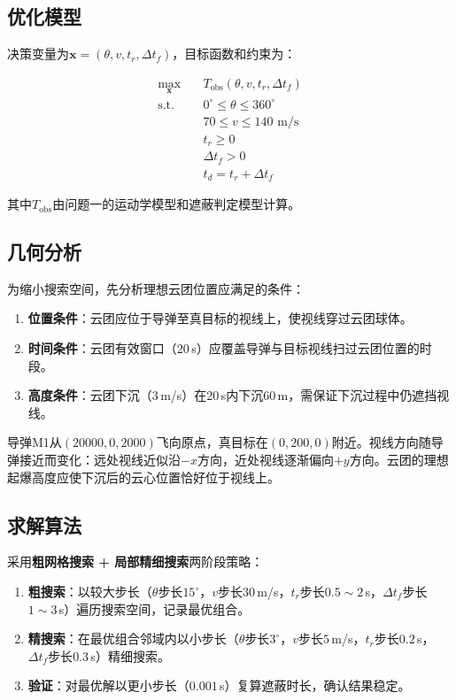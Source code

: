 \documentclass[a4paper]{ctexart}
\newcommand{\bm}[1]{\boldsymbol{#1}}
\begin{document}
\subsection{优化模型}

决策变量为$\bm{x} = (\theta, v, t_r, \Delta t_f)$，目标函数和约束为：

\begin{equation}
\begin{aligned}
\max_{\bm{x}} \quad & T_{\text{obs}}(\theta, v, t_r, \Delta t_f) \\
\text{s.t.} \quad & 0^\circ \leq \theta \leq 360^\circ \\
& 70 \leq v \leq 140 \text{ m/s} \\
& t_r \geq 0 \\
& \Delta t_f > 0 \\
& t_d = t_r + \Delta t_f
\end{aligned}
\label{eq:opt2}
\end{equation}

其中$T_{\text{obs}}$由问题一的运动学模型和遮蔽判定模型计算。

\subsection{几何分析}

为缩小搜索空间，先分析理想云团位置应满足的条件：

\begin{enumerate}[label=（\arabic*）]
  \item \textbf{位置条件}：云团应位于导弹至真目标的视线上，使视线穿过云团球体。
  \item \textbf{时间条件}：云团有效窗口（20\,s）应覆盖导弹与目标视线扫过云团位置的时段。
  \item \textbf{高度条件}：云团下沉（3\,m/s）在20\,s内下沉60\,m，需保证下沉过程中仍遮挡视线。
\end{enumerate}

导弹M1从$(20000, 0, 2000)$飞向原点，真目标在$(0, 200, 0)$附近。视线方向随导弹接近而变化：远处视线近似沿$-x$方向，近处视线逐渐偏向$+y$方向。云团的理想起爆高度应使下沉后的云心位置恰好位于视线上。

\subsection{求解算法}

采用\textbf{粗网格搜索 + 局部精细搜索}两阶段策略：

\begin{enumerate}[label=\textbf{步骤\arabic*：}]
  \item \textbf{粗搜索}：以较大步长（$\theta$步长$15^\circ$，$v$步长$30$\,m/s，$t_r$步长$0.5\sim 2$\,s，$\Delta t_f$步长$1\sim 3$\,s）遍历搜索空间，记录最优组合。
  \item \textbf{精搜索}：在最优组合邻域内以小步长（$\theta$步长$3^\circ$，$v$步长$5$\,m/s，$t_r$步长$0.2$\,s，$\Delta t_f$步长$0.3$\,s）精细搜索。
  \item \textbf{验证}：对最优解以更小步长（$0.001$\,s）复算遮蔽时长，确认结果稳定。
\end{enumerate}
\end{document}
